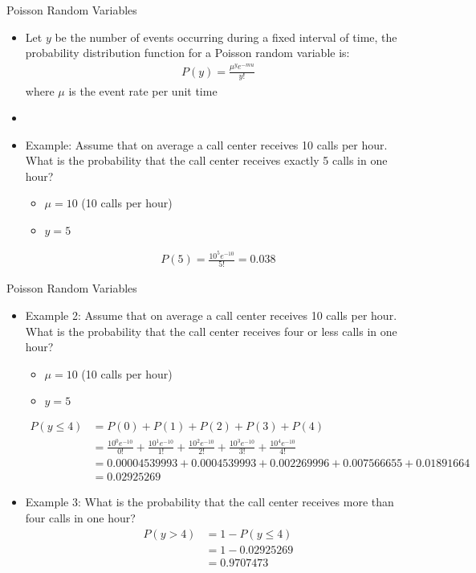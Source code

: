 \documentclass[xcolor=dvipsnames]{beamer}
\begin{document}
\begin{frame}{Poisson Random Variables}
	\begin{itemize}
		\item Let $y$ be the number of events occurring during a fixed interval of time, the probability distribution function for a Poisson random variable is: \pause
		\begin{gather*}
			P(y) = \frac{\mu ^ y e^{-mu}}{y!}
		\end{gather*}
		where $\mu$ is the event rate per unit time \pause
		\item[]
		\item Example: Assume that on average a call center receives 10 calls per hour. What is the probability that the call center receives exactly 5 calls in one hour? \pause
		\begin{itemize}
			\item $\mu = 10$ (10 calls per hour) \pause
			\item $y = 5$ \pause
		\end{itemize}
		\begin{align*}
			P(5) = \frac{10^5 e^{-10}}{5!} = 0.038
		\end{align*}
	\end{itemize}
\end{frame}

\begin{frame}{Poisson Random Variables}
	\begin{itemize}
		\item Example 2: Assume that on average a call center receives 10 calls per hour. What is the probability that the call center receives four or less calls in one hour?
		\begin{itemize}
			\item $\mu = 10$ (10 calls per hour)
			\item $y = 5$
		\end{itemize}\pause
	{\scriptsize
		\begin{align*}
		P(y \leq 4) &= P(0) + P(1) + P(2) + P(3) + P(4) \\
		&= \frac{10^0 e^{-10}}{0!} + \frac{10^1 e^{-10}}{1!} + \frac{10^2 e^{-10}}{2!} + \frac{10^3 e^{-10}}{3!} + \frac{10^4 e^{-10}}{4!} \\
		&=  0.00004539993 + 0.0004539993 + 0.002269996 + 0.007566655 + 0.01891664 \\
		&= 0.02925269
		\end{align*}} \pause
	\item Example 3: What is the probability that the call center receives more than four calls in one hour?
	\begin{align*}
		P(y > 4) &= 1 - P(y \leq 4) \\
		&= 1- 0.02925269 \\
		&=  0.9707473
	\end{align*}
	\end{itemize}
\end{frame}
\end{document}

